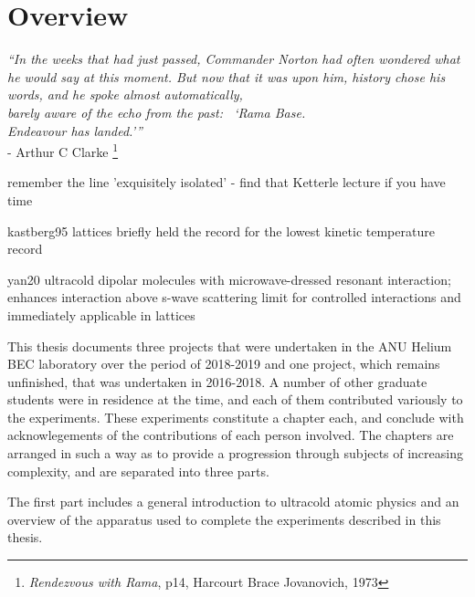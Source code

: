 

\chapter{Overview}
\begin{adjustwidth}{3cm}{0cm}
\begin{flushright}
{\emph{``In the weeks that had just passed, Commander Norton had often wondered what he would say at this moment.
	But now that it was upon him, history chose his words, and he spoke almost automatically, \\barely aware of the echo from the past: ~`Rama Base.\\ \emph{Endeavour} has landed.'''\\} 
- Arthur C Clarke \footnote{\emph{Rendezvous with Rama}, p14, Harcourt Brace Jovanovich, 1973}}
\end{flushright}
\end{adjustwidth}


remember the line 'exquisitely isolated' - find that Ketterle lecture if you have time

kastberg95
		lattices briefly held the record for the lowest kinetic temperature record

yan20 ultracold dipolar molecules with microwave-dressed resonant interaction; enhances interaction above s-wave scattering limit for controlled interactions and immediately applicable in lattices

This thesis documents three projects that were undertaken in the ANU
Helium BEC laboratory over the period of 2018-2019 and one project,
which remains unfinished, that was undertaken in 2016-2018.
	A number of
other graduate students were in residence at the time, and each of them
contributed variously to the experiments.
	These experiments constitute a
chapter each, and conclude with acknowlegements of the contributions of
each person involved.
	The chapters are arranged in such a way as to
provide a progression through subjects of increasing complexity, and are
separated into three parts.

The first part includes a general introduction to ultracold atomic
physics and an overview of the apparatus used to complete the
experiments described in this thesis.


